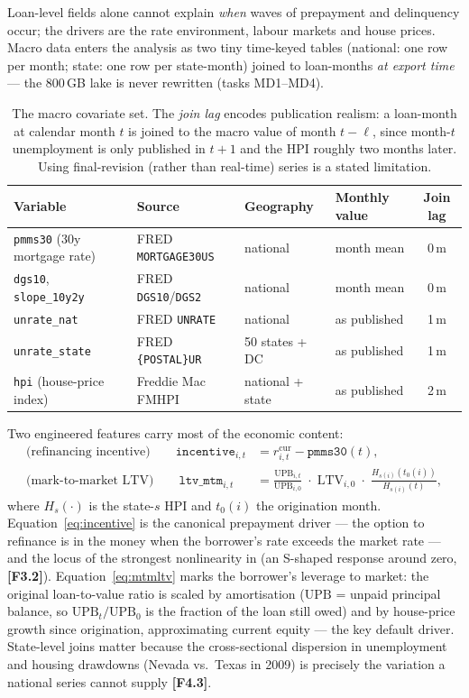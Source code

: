 \documentclass[11pt,a4paper]{article}
\newcommand{\code}[1]{\texttt{#1}}
\newcommand{\artifact}[1]{\textbf{[#1]}}
\begin{document}
Loan-level fields alone cannot explain \emph{when} waves of prepayment and delinquency occur; the drivers are the rate environment, labour markets and house prices. Macro data enters the analysis as two tiny time-keyed tables (national: one row per month; state: one row per state-month) joined to loan-months \emph{at export time} --- the 800\,GB lake is never rewritten (tasks MD1--MD4).

\begin{table}[h]
\centering\small
\begin{tabular}{llllc}
\toprule
Variable & Source & Geography & Monthly value & Join lag \\
\midrule
\code{pmms30} (30y mortgage rate) & FRED \code{MORTGAGE30US} & national & month mean & 0\,m \\
\code{dgs10}, \code{slope\_10y2y} & FRED \code{DGS10}/\code{DGS2} & national & month mean & 0\,m \\
\code{unrate\_nat} & FRED \code{UNRATE} & national & as published & 1\,m \\
\code{unrate\_state} & FRED \code{\{POSTAL\}UR} & 50 states + DC & as published & 1\,m \\
\code{hpi} (house-price index) & Freddie Mac FMHPI & national + state & as published & 2\,m \\
\bottomrule
\end{tabular}
\caption{The macro covariate set. The \emph{join lag} encodes publication realism: a loan-month at calendar month $t$ is joined to the macro value of month $t-\ell$, since month-$t$ unemployment is only published in $t{+}1$ and the HPI roughly two months later. Using final-revision (rather than real-time) series is a stated limitation.}
\label{tab:macro}
\end{table}

Two engineered features carry most of the economic content:
\begin{align}
\label{eq:incentive}
\text{(refinancing incentive)} \qquad
\code{incentive}_{i,t} &= r^{\mathrm{cur}}_{i,t} - \code{pmms30}(t),\\[2pt]
\label{eq:mtmltv}
\text{(mark-to-market LTV)} \qquad
\code{ltv\_mtm}_{i,t} &= \frac{\mathrm{UPB}_{i,t}}{\mathrm{UPB}_{i,0}}\;\cdot\;\mathrm{LTV}_{i,0}\;\cdot\;\frac{H_{s(i)}\!\left(t_0(i)\right)}{H_{s(i)}(t)},
\end{align}
where $H_s(\cdot)$ is the state-$s$ HPI and $t_0(i)$ the origination month. Equation~\eqref{eq:incentive} is the canonical prepayment driver --- the option to refinance is in the money when the borrower's rate exceeds the market rate --- and the locus of the strongest nonlinearity in \citet{sirignano2021} (an S-shaped response around zero, \artifact{F3.2}). Equation~\eqref{eq:mtmltv} marks the borrower's leverage to market: the original loan-to-value ratio is scaled by amortisation ($\mathrm{UPB}$ = unpaid principal balance, so $\mathrm{UPB}_t/\mathrm{UPB}_0$ is the fraction of the loan still owed) and by house-price growth since origination, approximating current equity --- the key default driver. State-level joins matter because the cross-sectional dispersion in unemployment and housing drawdowns (Nevada vs.\ Texas in 2009) is precisely the variation a national series cannot supply \artifact{F4.3}.
\end{document}
